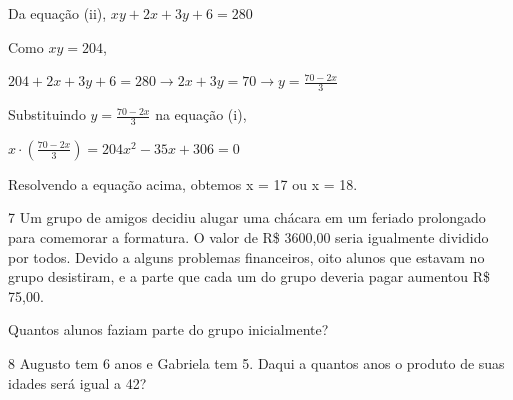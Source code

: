 {{{\begin{escolha}
{Da equação (ii),
$xy + 2x + 3y + 6 = 280$

Como $xy =204$,

$204 + 2x + 3y + 6 = 280 \rightarrow
2x + 3y = 70 \rightarrow
y = \frac{70-2x}{3}$

Substituindo $y = \frac{70-2x}{3}$ na equação (i),

$x \cdot \left ( \frac{70-2x}{3} \right ) = 204

x^2 - 35x + 306 = 0$

Resolvendo a equação acima, obtemos x = 17 ou x = 18.}

\num{7} Um grupo de amigos decidiu alugar uma chácara em um feriado
prolongado para comemorar a formatura. O valor de R\$ 3600,00 seria igualmente
dividido por todos. Devido a alguns problemas financeiros, oito alunos
que estavam no grupo desistiram, e a parte que cada um do grupo deveria
pagar aumentou R\$ 75,00.

Quantos alunos faziam parte do grupo inicialmente?



\num{8} Augusto tem 6 anos e Gabriela tem 5. Daqui a quantos anos o produto
de suas idades será igual a 42?




\end{escolha}}}}
